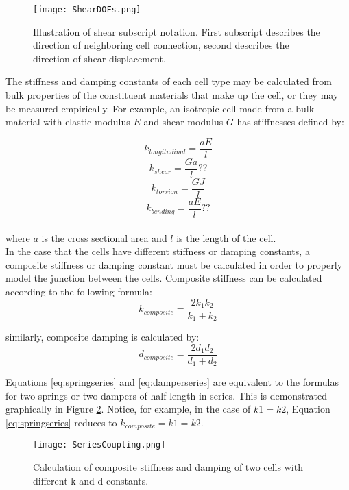 {\begin{figure}
  \texttt{[image: ShearDOFs.png]}
  \caption{Illustration of shear subscript notation.  First subscript describes the direction of neighboring cell connection, second describes the direction of shear displacement.}
  \label{fig:ShearDOFs}
\end{figure}

The stiffness and damping constants of each cell type may be calculated from bulk properties of the constituent materials that make up the cell, or they may be measured empirically.  For example, an isotropic cell made from a bulk material with elastic modulus $E$ and shear modulus $G$ has stiffnesses defined by:

\[ k_{longitudinal} = \dfrac{aE}{l}\]
\[ k_{shear} = \dfrac{Ga}{l} ??\]
\[ k_{torsion} = \dfrac{GJ}{l}\]
\[ k_{bending} = \dfrac{aE}{l} ??\]
\\
where $a$ is the cross sectional area and $l$ is the length of the cell.\\

 In the case that the cells have different stiffness or damping constants, a composite stiffness or damping constant must be calculated in order to properly model the junction between the cells.  Composite stiffness can be calculated according to the following formula:
 \begin{equation} \label{eq:springseries}
 k_{composite} = \dfrac{2k_1k_2}{k_1+k_2}
 \end{equation}

similarly, composite damping is calculated by:
 \begin{equation} \label{eq:damperseries}
d_{composite} = \dfrac{2d_1d_2}{d_1+d_2}
 \end{equation}
 
 Equations \ref{eq:springseries} and \ref{eq:damperseries} are equivalent to the formulas for two springs or two dampers of half length in series.  This is demonstrated graphically in Figure \ref{fig:SeriesCoupling}.  Notice, for example, in the case of $k1=k2$, Equation \ref{eq:springseries} reduces to $ k_{composite} = k1 = k2$.\\
 
 \begin{figure}
  \texttt{[image: SeriesCoupling.png]}
  \caption{Calculation of composite stiffness and damping of two cells with different k and d constants.}
  \label{fig:SeriesCoupling}
\end{figure}


}
